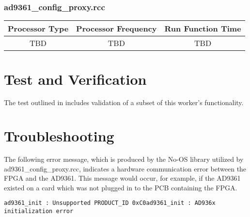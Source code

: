 \documentclass{article}
\def\comp{ad9361\_config\_proxy}
\begin{document}
\subsubsection*{\comp.rcc}
\begin{scriptsize}
        \begin{tabular}{|c|c|c|}
                \hline
                \rowcolor{blue}
                Processor Type & Processor Frequency & Run Function Time \\
                \hline
                TBD            & TBD                 & TBD               \\
                \hline
        \end{tabular}
\end{scriptsize}

\section*{Test and Verification}
The test outlined in \cite{dac_comp_datasheet} includes validation of a subset of this worker's functionality.

\section*{Troubleshooting}
The following error message, which is produced by the No-OS library\cite{no_os} utilized by \comp{}.rcc, indicates a hardware communication error between the FPGA and the AD9361. This message would occur, for example, if the AD9361 existed on a card which was not plugged in to the PCB containing the FPGA.
\begin{lstlisting}
ad9361_init : Unsupported PRODUCT_ID 0xC0ad9361_init : AD936x initialization error
\end{lstlisting}
\end{document}
